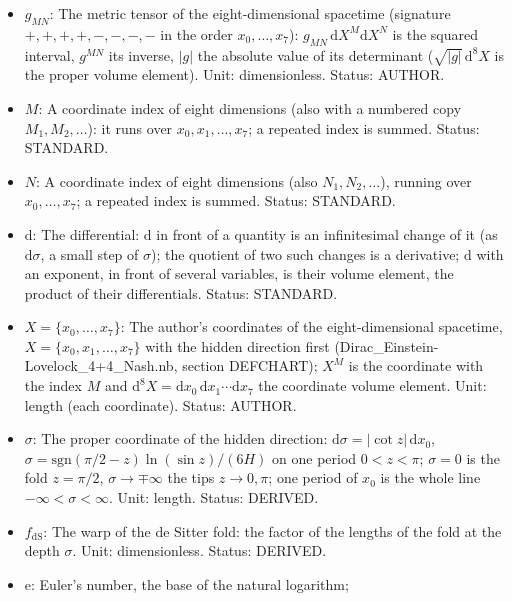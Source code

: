 \documentclass[
  10pt,
]{article}
\providecommand{\tightlist}{%
  \setlength{\itemsep}{0pt}\setlength{\parskip}{0pt}}
\begin{document}
\begin{itemize}
\tightlist
\item
  \(g_{MN}\): The metric tensor of the eight-dimensional spacetime
  (signature \(+,+,+,+,-,-,-,-\) in the order \(x_0, \dots, x_7\)):
  \(g_{MN}\,\mathrm{d}X^M\mathrm{d}X^N\) is the squared interval,
  \(g^{MN}\) its inverse, \(\lvert g\rvert\) the absolute value of its
  determinant (\(\sqrt{\lvert g\rvert}\,\mathrm{d}^8X\) is the proper
  volume element). Unit: dimensionless. Status: AUTHOR.
\item
  \(M\): A coordinate index of eight dimensions (also with a numbered
  copy \(M_1, M_2, \dots\)): it runs over \(x_0, x_1, \dots, x_7\); a
  repeated index is summed. Status: STANDARD.
\item
  \(N\): A coordinate index of eight dimensions (also
  \(N_1, N_2, \dots\)), running over \(x_0, \dots, x_7\); a repeated
  index is summed. Status: STANDARD.
\item
  \(\mathrm{d}\): The differential: \(\mathrm{d}\) in front of a
  quantity is an infinitesimal change of it (as \(\mathrm{d}\sigma\), a
  small step of \(\sigma\)); the quotient of two such changes is a
  derivative; \(\mathrm{d}\) with an exponent, in front of several
  variables, is their volume element, the product of their
  differentials. Status: STANDARD.
\item
  \(X = \{x_0, \dots, x_7\}\): The author's coordinates of the
  eight-dimensional spacetime, \(X = \{x_0, x_1, \dots, x_7\}\) with the
  hidden direction first (Dirac\_Einstein-Lovelock\_4+4\_Nash.nb,
  section DEFCHART); \(X^M\) is the coordinate with the index \(M\) and
  \(\mathrm{d}^8X = \mathrm{d}x_0\,\mathrm{d}x_1\cdots\mathrm{d}x_7\)
  the coordinate volume element. Unit: length (each coordinate). Status:
  AUTHOR.
\item
  \(\sigma\): The proper coordinate of the hidden direction:
  \(\mathrm{d}\sigma = \lvert\cot z\rvert\,\mathrm{d}x_0\),
  \(\sigma = \mathrm{sgn}(\pi/2 - z)\ln(\sin z)/(6H)\) on one period
  \(0 < z < \pi\); \(\sigma = 0\) is the fold \(z = \pi/2\),
  \(\sigma \to \mp\infty\) the tips \(z \to 0, \pi\); one period of
  \(x_0\) is the whole line \(-\infty < \sigma < \infty\). Unit: length.
  Status: DERIVED.
\item
  \(f_{\mathrm{dS}}\): The warp of the de Sitter fold: the factor of the
  lengths of the fold at the depth \(\sigma\). Unit: dimensionless.
  Status: DERIVED.
\item
  \(\mathrm{e}\): Euler's number, the base of the natural logarithm;

\end{itemize}
\end{document}
